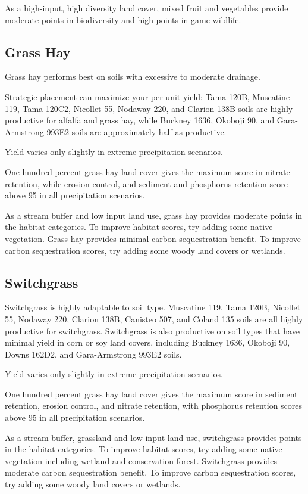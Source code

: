 \documentclass[11pt]{article}
\begin{document}
As a high-input, high diversity land cover, mixed fruit and vegetables provide moderate points in biodiversity and high points in game wildlife.

\subsection{Grass Hay}

Grass hay performs best on soils with excessive to moderate drainage.

Strategic placement can maximize your per-unit yield: Tama 120B, Muscatine 119, Tama 120C2, Nicollet 55, Nodaway 220, and Clarion 138B soils are highly productive for alfalfa and grass hay, while Buckney 1636, Okoboji 90, and Gara-Armstrong 993E2 soils are approximately half as productive.

Yield varies only slightly in extreme precipitation scenarios.

One hundred percent grass hay land cover gives the maximum score in nitrate retention, while erosion control, and sediment and phosphorus retention score above 95 in all precipitation scenarios.

As a stream buffer and low input land use, grass hay provides moderate points in the habitat categories. To improve habitat scores, try adding some native vegetation. Grass hay provides minimal carbon sequestration benefit.  To improve carbon sequestration scores, try adding some woody land covers or wetlands.

\subsection{Switchgrass}

Switchgrass is highly adaptable to soil type. Muscatine 119, Tama 120B, Nicollet 55, Nodaway 220, Clarion 138B, Canisteo 507, and Coland 135 soils are all highly productive for switchgrass. Switchgrass is also productive on soil types that have minimal yield in corn or soy land covers, including Buckney 1636, Okoboji 90, Downs 162D2, and Gara-Armstrong 993E2 soils.

Yield varies only slightly in extreme precipitation scenarios.

One hundred percent grass hay land cover gives the maximum score in sediment retention, erosion control, and nitrate retention, with phosphorus retention scores above 95 in all precipitation scenarios.

As a stream buffer, grassland and low input land use, switchgrass provides points in the habitat categories. To improve habitat scores, try adding some native vegetation including wetland and conservation forest. Switchgrass provides moderate carbon sequestration benefit.  To improve carbon sequestration scores, try adding some woody land covers or wetlands.
\end{document}

